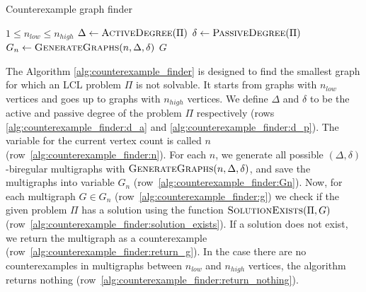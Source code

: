 \begin{algorithm}[H]
    \caption{Counterexample graph finder}
    \label{alg:counterexample_finder}
    \begin{algorithmic}[1] %
        \Require $1 \leq n_{low} \leq n_{high}$
          \label{alg:counterexample_finder:n_loop}
            \State $\Delta \gets \textsc{ActiveDegree}(\Pi)$ \label{alg:counterexample_finder:d_a}
            \State $\delta \gets \textsc{PassiveDegree}(\Pi)$ \label{alg:counterexample_finder:d_p}
              \label{alg:counterexample_finder:n}
                \State $G_n \gets \textsc{GenerateGraphs}(n, \Delta, \delta)$ \label{alg:counterexample_finder:Gn}
                 \label{alg:counterexample_finder:g}
                     \label{alg:counterexample_finder:solution_exists}
                        \State \Return $G$ \label{alg:counterexample_finder:return_g}
                    \EndIf
                \EndFor
            \EndFor
            \State \Return {} \label{alg:counterexample_finder:return_nothing}
        \EndFunction
    \end{algorithmic}
\end{algorithm}

The Algorithm \ref{alg:counterexample_finder} is designed to find the smallest graph for which an LCL problem $\Pi$ is not solvable.
It starts from graphs with $n_{low}$ vertices and goes up to graphs with $n_{high}$ vertices.
We define $\Delta$ and $\delta$ to be the active and passive degree of the problem $\Pi$ respectively (rows \ref{alg:counterexample_finder:d_a} and \ref{alg:counterexample_finder:d_p}).
The variable for the current vertex count is called $n$ (row~\ref{alg:counterexample_finder:n}).
For each $n$, we generate all possible $(\Delta, \delta)$-biregular multigraphs with $\textsc{GenerateGraphs}(n, \Delta, \delta)$, and save the multigraphs into variable $G_n$ (row~\ref{alg:counterexample_finder:Gn}).
Now, for each multigraph $G \in G_n$ (row~\ref{alg:counterexample_finder:g}) we check if the given problem $\Pi$ has a solution using the function $\textsc{SolutionExists}(\Pi, G)$ (row~\ref{alg:counterexample_finder:solution_exists}).
If a solution does not exist, we return the multigraph as a counterexample (row~\ref{alg:counterexample_finder:return_g}).
In the case there are no counterexamples in multigraphs between $n_{low}$ and $n_{high}$ vertices, the algorithm returns nothing (row~\ref{alg:counterexample_finder:return_nothing}).

